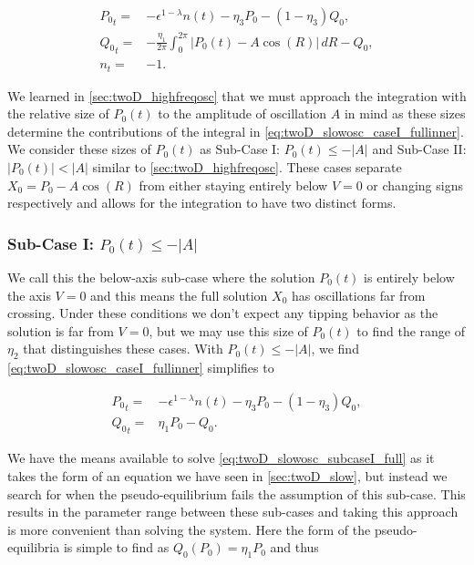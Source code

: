 \begin{equation}\label{eq:twoD_slowosc_caseI_fullinner}
\begin{aligned}
{P_0}_t =& -\epsilon^{1-\lambda} n(t) -\eta_3 P_0-(1-\eta_3)Q_0, \\
{Q_0}_t =& -\frac{\eta_1}{2\pi}\int_0^{2\pi}|P_0(t)-A\cos(R)|\,dR-Q_0,\\
n_t =& -1.
\end{aligned}
\end{equation}

We learned in \autoref{sec:twoD_highfreqosc} that we must approach the integration with the relative size of $P_0(t)$ to the amplitude of oscillation $A$ in mind as these sizes determine the contributions of the integral in \eqref{eq:twoD_slowosc_caseI_fullinner}. We consider these sizes of $P_0(t)$ as Sub-Case I: $P_0(t)\le -|A|$ and Sub-Case II: $|P_0(t)|<|A|$ similar to \autoref{sec:twoD_highfreqosc}. These cases separate $X_0=P_0-A\cos(R)$ from either staying entirely below $V=0$ or changing signs respectively and allows for the integration to have two distinct forms.

\subsubsection{Sub-Case I: $P_0(t)\le -|A|$}

We call this the below-axis sub-case where the solution $P_0(t)$ is entirely below the axis $V=0$ and this means the full solution $X_0$ has oscillations far from crossing. Under these conditions we don't expect any tipping behavior as the solution is far from $V=0$, but we may use this size of $P_0(t)$ to find the range of $\eta_2$ that distinguishes these cases. With $P_0(t)\le -|A|$, we find \eqref{eq:twoD_slowosc_caseI_fullinner} simplifies to

\begin{equation}\label{eq:twoD_slowosc_subcaseI_full}
\begin{aligned}
{P_0}_t =& -\epsilon^{1-\lambda} n(t) -\eta_3 P_0-(1-\eta_3)Q_0, \\
{Q_0}_t =& \eta_1 P_0-Q_0.
\end{aligned}
\end{equation}

We have the means available to solve \eqref{eq:twoD_slowosc_subcaseI_full} as it takes the form of an equation we have seen in \autoref{sec:twoD_slow}, but instead we search for when the pseudo-equilibrium fails the assumption of this sub-case. This results in the parameter range between these sub-cases and taking this approach is more convenient than solving the system. Here the form of the pseudo-equilibria is simple to find as $Q_0(P_0) = \eta_1P_0$ and thus 

